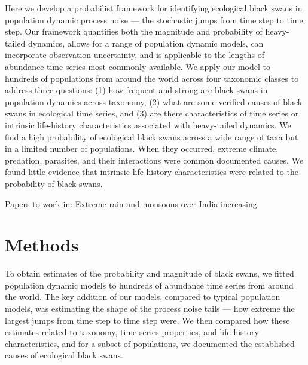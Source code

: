 Here we develop a probabilist framework for identifying ecological black swans in population dynamic process noise --- the stochastic jumps from time step to time step. Our framework quantifies both the magnitude and probability of heavy-tailed dynamics, allows for a range of population dynamic models, can incorporate observation uncertainty, and is applicable to the lengths of abundance time series most commonly available. We apply our model to hundreds of populations from around the world across four taxonomic classes to address three questions: (1) how frequent and strong are black swans in population dynamics across taxonomy, (2) what are some verified causes of black swans in ecological time series, and (3) are there characteristics of time series or intrinsic life-history characteristics associated with heavy-tailed dynamics. We find a high probability of ecological black swans across a wide range of taxa but in a limited number of populations. When they occurred, extreme climate, predation, parasites, and their interactions were common documented causes. We found little evidence that intrinsic life-history characteristics were related to the probability of black swans.

Papers to work in: \citep{inchausti2002, halley2002, inchausti2001} \citep{jentsch2007} \citep{ward2007} \citep{garcia-carreras2011} \citep{sornette2009} \citep{nunez2012} \citep{thompson2013} \citep{beaugrand2012} \citep{pine-iii2009} \citep{doak2008} Extreme rain and monsoons over India increasing \citep{goswami2006} \citep{smale2013} \citep{easterling2000} \citep{scheffer2003} \citep{katz2005} \citep{taleb2007} \citep{vasseur2014} \citep{vert-pre2013} \citep{lindenmayer2010} \citep{valpine2002} \citep{gregory2010} \citet{garcia-carreras2011} \citeauthor{brook2006} \citetext{\citeyear{brook2006}; \citealp{herrandoprez2014}} \citep{sibly2005, ziebarth2010}

\section{Methods}

To obtain estimates of the probability and magnitude of black swans, we fitted population dynamic models to hundreds of abundance time series from around the world. The key addition of our models, compared to typical population models, was estimating the shape of the process noise tails --- how extreme the largest jumps from time step to time step were. We then compared how these estimates related to taxonomy, time series properties, and life-history characteristics, and for a subset of populations, we documented the established causes of ecological black swans.

